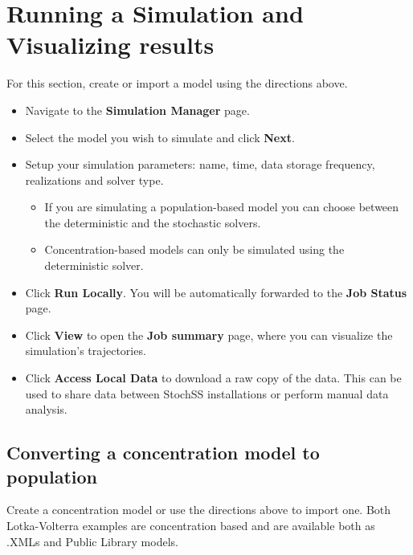 \section{Running a Simulation and Visualizing results}

For this section, create or import a model using the directions above.

\begin{itemize}
  \item Navigate to the \textbf{Simulation Manager} page.
  \item Select the model you wish to simulate and click \textbf{Next}.
  \item Setup your simulation parameters: name, time, data storage frequency, realizations and solver type. 
  \begin{itemize}
    \item If you are simulating a population-based model you can choose between the deterministic and the stochastic solvers.
    \item Concentration-based models can only be simulated using the deterministic solver.
  \end{itemize}  
  \item Click \textbf{Run Locally}. You will be automatically forwarded to the \textbf{Job Status} page.%
  \item Click \textbf{View} to open the \textbf{Job summary} page, where you can visualize the simulation's trajectories.
  \item Click \textbf{Access Local Data} to download a raw copy of the data. This can be used to share data between StochSS installations or perform manual data analysis.
\end{itemize}

\subsection{Converting a concentration model to population}
Create a concentration model or use the directions above to import one. Both Lotka-Volterra examples are concentration based and are available both as .XMLs and Public Library models.

